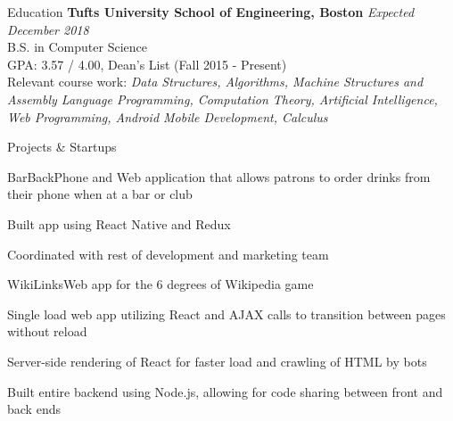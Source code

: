 \documentclass{resume}
\begin{document}
  \begin{rSection}{Education}
    {\bf Tufts University School of Engineering, Boston} \hfill {\em Expected December 2018} \\ 
    { B.S. in Computer Science} \\
    GPA: 3.57 / 4.00, Dean's List (Fall 2015 - Present)\\
    Relevant course work: \textit{Data Structures, Algorithms, Machine Structures and Assembly Language Programming, Computation Theory, Artificial Intelligence, Web Programming, Android Mobile Development, Calculus}
  \end{rSection}
  
  \begin{rSection}{Projects \& Startups}
  
    \begin{rSubsection}{BarBack}{}{\normalfont Phone and Web application that allows patrons to order drinks from their phone when at a bar or club}{}
    \item Built app using React Native and Redux
    \item Coordinated with rest of development and marketing team 
  \end{rSubsection}
  
  \begin{rSubsection}{WikiLinks}{}{\normalfont Web app for the 6 degrees of Wikipedia game}{}
  \item Single load web app utilizing React and AJAX calls to transition between pages without reload
  \item Server-side rendering of React for faster load and crawling of HTML by bots
  \item Built entire backend using Node.js, allowing for code sharing between front and back ends
  \end{rSubsection}
   
  \end{rSection}
  
\end{document}
